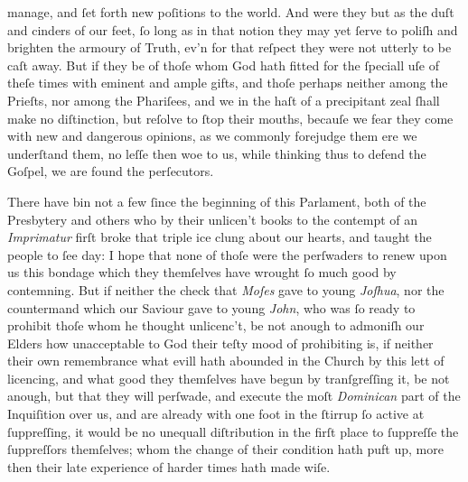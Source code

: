manage, and ſet forth new poſitions to the world.  And were they but as the duſt
and cinders of our feet, ſo long as in that notion they may yet ſerve to poliſh
and brighten the armoury of Truth, ev'n for that reſpect they were not utterly
to be caſt away.  But if they be of thoſe whom God hath fitted for the ſpeciall
uſe of theſe times with eminent and ample gifts, and thoſe perhaps neither among
the Prieſts, nor among the Phariſees, and we in the haſt of a precipitant zeal
ſhall make no diſtinction, but reſolve to ſtop their mouths, becauſe we fear
they come with new and dangerous opinions, as we commonly forejudge them ere we
underſtand them, no leſſe then woe to us, while thinking thus to defend the
Goſpel, we are found the perſecutors.

There have bin not a few ſince the beginning of this Parlament, both of the
Presbytery and others who by their unlicen't books to the contempt of an
\textit{Imprimatur} firſt broke that triple ice clung about our hearts, and
taught the people to ſee day: I hope that none of thoſe were the perſwaders to
renew upon us this bondage which they themſelves have wrought ſo much good by
contemning.  But if neither the check that \textit{Moſes} gave to young
\textit{Joſhua}, nor the countermand which our Saviour gave to young
\textit{John}, who was ſo ready to prohibit thoſe whom he thought unlicenc't, be
not anough to admoniſh our Elders how unacceptable to God their teſty mood of
prohibiting is, if neither their own remembrance what evill hath abounded in the
Church by this lett of licencing, and what good they themſelves have begun by
tranſgreſſing it, be not anough, but that they will perſwade, and execute the
moſt \textit{Dominican} part of the Inquiſition over us, and are already with
one foot in the ſtirrup ſo active at ſuppreſſing, it would be no unequall
diſtribution in the firſt place to ſuppreſſe the ſuppreſſors themſelves; whom
the change of their condition hath puft up, more then their late experience of
harder times hath made wiſe.


